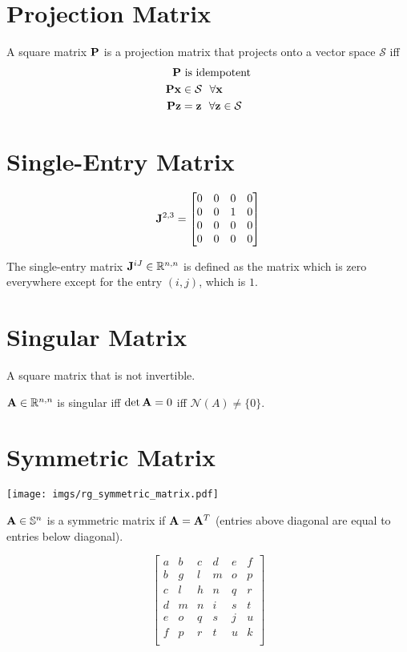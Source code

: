 \section{Projection Matrix}
A square matrix $\mathbf{P}$ is a projection matrix that projects onto a vector space $\mathcal{S}$ iff
\begin{align}
\mathbf{P}&~\textrm{is idempotent} \\
\mathbf{P}\mathbf{x}&\in\mathcal{S}~~\forall\mathbf{x} \\
\mathbf{P}\mathbf{z}&=\mathbf{z}~~\forall\mathbf{z}\in\mathcal{S}
\end{align}


\section{Single-Entry Matrix}
\label{sec:rogue_single_entry}
\begin{equation}
\mathbf{J}^{2,3} =
\begin{bmatrix}
0 & 0 & 0 & 0 \\
0 & 0 & 1 & 0 \\
0 & 0 & 0 & 0 \\
0 & 0 & 0 & 0
\end{bmatrix}
\end{equation}

The single-entry matrix $\mathbf{J}^{iJ}\in\mathbb{R}^{n,n}$ is defined as the matrix which is zero everywhere except for the entry $(i,j)$, which is $1$.





\section{Singular Matrix}
A square matrix that is not invertible.

$\mathbf{A}\in\mathbb{R}^{n,n}$ is singular iff $\det \mathbf{A}=0$ iff $\mathcal{N}(A)\ne\{0\}$.


\section{Symmetric Matrix}

\begin{center}
\texttt{[image: imgs/rg\_symmetric\_matrix.pdf]}
\end{center}

$\mathbf{A}\in\mathbb{S}^{n}$ is a symmetric matrix if $\mathbf{A}=\mathbf{A}^T$ (entries above diagonal are equal to entries below diagonal).

\begin{equation}
\begin{bmatrix}
a & b & c & d & e & f \\
b & g & l & m & o & p \\
c & l & h & n & q & r \\
d & m & n & i & s & t \\
e & o & q & s & j & u \\
f & p & r & t & u & k \\
\end{bmatrix}
\end{equation}


